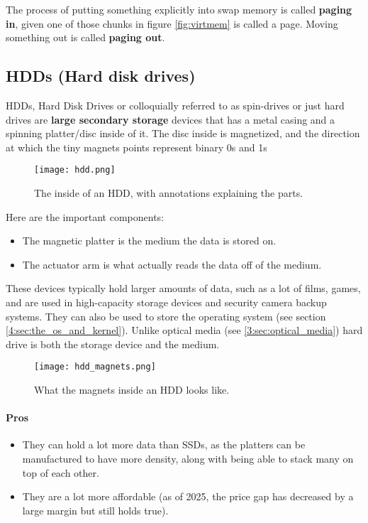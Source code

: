 \documentclass[../main.tex]{subfiles}
\begin{document}
The process of putting something explicitly into swap memory is called \textbf{paging in}, given one of those chunks in figure \ref{fig:virtmem} is called a page. Moving something out is called \textbf{paging out}.

\subsection{HDDs (Hard disk drives)}

HDDs, Hard Disk Drives or colloquially referred to as spin-drives or just hard drives are \textbf{large secondary storage} devices that has a metal casing and a spinning platter/disc inside of it. The disc inside is magnetized, and the direction at which the tiny magnets points represent binary 0s and 1s

\begin{figure}[H]
    \centering
    \texttt{[image: hdd.png]}
    \caption{The inside of an HDD, with annotations explaining the parts.}
    \label{fig:hdd}
\end{figure}

Here are the important components:

\begin{itemize}
    \item The magnetic platter is the medium the data is stored on.
    \item The actuator arm is what actually reads the data off of the medium.
\end{itemize}

These devices typically hold larger amounts of data, such as a lot of films, games, and are used in high-capacity storage devices and security camera backup systems. They can also be used to store the operating system (see section \ref{4:sec:the_os_and_kernel}). Unlike optical media (see \ref{3:sec:optical_media}) hard drive is both the storage device and the medium.

\begin{figure}[H]
    \centering
    \texttt{[image: hdd\_magnets.png]}
    \caption{What the magnets inside an HDD looks like.}
    \label{fig:hdd_magnets}
\end{figure}

\paragraph{Pros}
\begin{itemize}
    \item They can hold a lot more data than SSDs, as the platters can be manufactured to have more density, along with being able to stack many on top of each other.
    \item They are a lot more affordable (as of 2025, the price gap has decreased by a large margin but still holds true).
\end{itemize}
\end{document}
